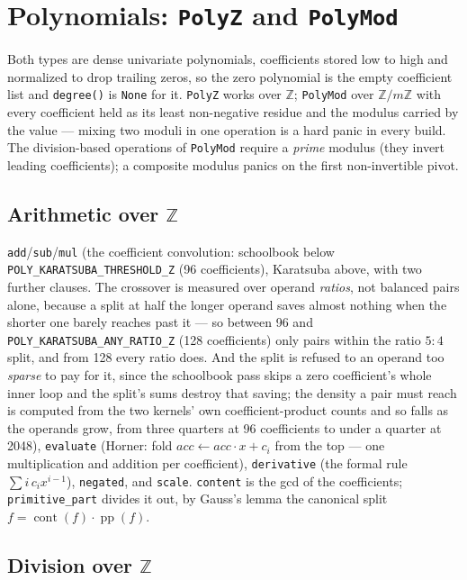 \documentclass[11pt]{article}
\newcommand{\code}[1]{\texttt{#1}}
\newcommand{\Z}{\mathbb{Z}}
\begin{document}
\section{Polynomials: \code{PolyZ} and \code{PolyMod}}

Both types are dense univariate polynomials, coefficients stored low to
high and normalized to drop trailing zeros, so the zero polynomial is the
empty coefficient list and \code{degree()} is \code{None} for it.
\code{PolyZ} works over $\Z$; \code{PolyMod} over $\Z/m\Z$ with every
coefficient held as its least non-negative residue and the modulus carried
by the value --- mixing two moduli in one operation is a hard panic in
every build. The division-based operations of \code{PolyMod} require a
\emph{prime} modulus (they invert leading coefficients); a composite
modulus panics on the first non-invertible pivot.

\subsection{Arithmetic over $\Z$}

\code{add}/\code{sub}/\code{mul} (the coefficient convolution: schoolbook
below \code{POLY\_KARATSUBA\_THRESHOLD\_Z} (96 coefficients), Karatsuba
above, with two further clauses. The
crossover is measured over operand \emph{ratios}, not balanced pairs
alone, because a split at half the longer operand saves almost nothing
when the shorter one barely reaches past it --- so between 96 and
\code{POLY\_KARATSUBA\_ANY\_RATIO\_Z} (128 coefficients) only pairs within
the ratio $5:4$ split, and from 128 every ratio
does. And the split is refused to an operand too \emph{sparse} to pay for
it, since the schoolbook pass skips a zero coefficient's whole inner loop
and the split's sums destroy that saving; the density a pair must reach is
computed from the two kernels' own coefficient-product counts and so falls
as the operands grow, from three quarters at 96 coefficients to under a
quarter at 2048),
\code{evaluate} (Horner: fold $\mathit{acc} \gets \mathit{acc} \cdot x +
c_i$ from the top --- one multiplication and addition per coefficient),
\code{derivative} (the formal rule $\sum i\,c_i x^{i-1}$),
\code{negated}, and \code{scale}. \code{content} is the gcd of the
coefficients; \code{primitive\_part} divides it out, by Gauss's lemma the
canonical split $f = \operatorname{cont}(f) \cdot \operatorname{pp}(f)$.

\subsection{Division over $\Z$}
\end{document}

